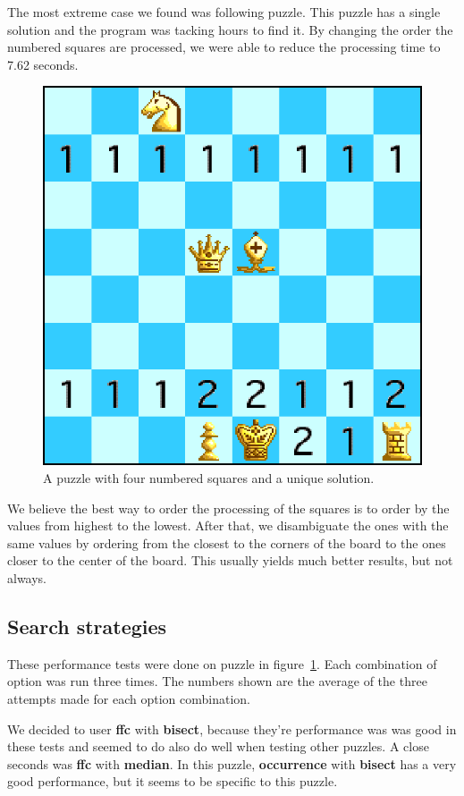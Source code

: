 \documentclass[runningheads]{llncs}
\begin{document}
The most extreme case we found was following puzzle. This puzzle has a single
solution and the program was tacking hours to find it. By changing the order
the numbered squares are processed, we were able to reduce the processing time
to 7.62 seconds.

\begin{figure}[H]
  \centering
  \includegraphics[width=0.4\linewidth]{figures/chess7.eps}
  \caption{A puzzle with four numbered squares and a unique solution.}\label{fig:fig6}
\end{figure}

We believe the best way to order the processing of the squares is to order by
the values from highest to the lowest. After that, we disambiguate the ones
with the same values by ordering from the closest to the corners of the board
to the ones closer to the center of the board. This usually yields much better
results, but not always.

\subsection{Search strategies}

These performance tests were done on puzzle in figure~\ref{fig:fig6}. Each combination
of option was run three times. The numbers shown are the average of the three
attempts made for each option combination.

We decided to user \textbf{ffc} with \textbf{bisect}, because they're performance
was was good in these tests and seemed to do also do well when testing other
puzzles. A close seconds was \textbf{ffc} with \textbf{median}. In this puzzle,
\textbf{occurrence} with \textbf{bisect} has a very good performance, but it
seems to be specific to this puzzle.
\end{document}
